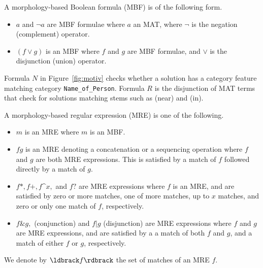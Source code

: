 

A morphology-based Boolean formula (MBF) is of the following form. 
\begin{itemize}
  \item $a$ and $\neg a$ are MBF formulae where $a$ an MAT, where
    $\neg$ is the negation (complement) operator. 
  \item $(f \vee g)$ is an MBF where $f$ and $g$ are MBF formulae, 
    and $\vee$ is the disjunction (union) operator. 
\end{itemize}
Formula $N$ in Figure~\ref{fig:motiv} checks whether a solution has a category
feature matching category {\tt Name\_of\_Person}.
Formula $R$ is the disjunction of MAT terms that check for
solutions matching stems such as  (near) and  (in).

A morphology-based regular expression (MRE) is one of the following. 
\begin{itemize}
\item $m$ is an MRE where $m$ is an MBF.
\item $fg$ is an MRE denoting a concatenation or a sequencing operation
  where $f$ and $g$ are both MRE expressions. This is 
  satisfied by a match of $f$ followed directly by a match of $g$. 
\item $f*,f+,f$\textasciicircum$x,$ and $f?$ are MRE expressions where $f$ is an MRE,
  and are satisfied by zero or more matches, one of more matches, up to $x$ matches, 
  and zero or only one match of $f$, respectively.
\item $f\& g,$ (conjunction) and $f|g$ (disjunction) are  MRE expressions where 
  $f$ and $g$ are MRE expressions, and are satisfied by a 
  a match of both $f$ and $g$, 
  and a match of either $f$ or $g$, respectively. 
\end{itemize}
We denote by $\ldbrack f\rdbrack$ the set of matches of an MRE $f$. 

